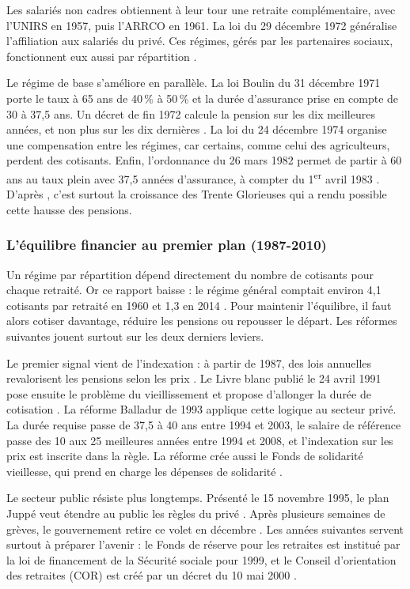 Les salariés non cadres obtiennent à leur tour une retraite complémentaire, avec l'UNIRS en 1957, puis l'ARRCO en 1961. La loi du 29 décembre 1972 généralise l'affiliation aux salariés du privé. Ces régimes, gérés par les partenaires sociaux, fonctionnent eux aussi par répartition \cite{valat2022}.

Le régime de base s'améliore en parallèle. La loi Boulin du 31 décembre 1971 porte le taux à 65 ans de 40\,\% à 50\,\% et la durée d'assurance prise en compte de 30 à 37,5 ans. Un décret de fin 1972 calcule la pension sur les dix meilleures années, et non plus sur les dix dernières \cite{cfdt}. La loi du 24 décembre 1974 organise une compensation entre les régimes, car certains, comme celui des agriculteurs, perdent des cotisants. Enfin, l'ordonnance du 26 mars 1982 permet de partir à 60 ans au taux plein avec 37,5 années d'assurance, à compter du 1\textsuperscript{er} avril 1983 \cite{fabas2023}. D'après \cite{valat2022}, c'est surtout la croissance des Trente Glorieuses qui a rendu possible cette hausse des pensions.

\subsubsection{L'équilibre financier au premier plan (1987-2010)}

Un régime par répartition dépend directement du nombre de cotisants pour chaque retraité. Or ce rapport baisse : le régime général comptait environ 4,1 cotisants par retraité en 1960 et 1,3 en 2014 \cite{cnav2015}. Pour maintenir l'équilibre, il faut alors cotiser davantage, réduire les pensions ou repousser le départ. Les réformes suivantes jouent surtout sur les deux derniers leviers.

Le premier signal vient de l'indexation : à partir de 1987, des lois annuelles revalorisent les pensions selon les prix \cite{cfdt}. Le Livre blanc publié le 24 avril 1991 pose ensuite le problème du vieillissement et propose d'allonger la durée de cotisation \cite{fabas2023}. La réforme Balladur de 1993 applique cette logique au secteur privé. La durée requise passe de 37,5 à 40 ans entre 1994 et 2003, le salaire de référence passe des 10 aux 25 meilleures années entre 1994 et 2008, et l'indexation sur les prix est inscrite dans la règle. La réforme crée aussi le Fonds de solidarité vieillesse, qui prend en charge les dépenses de solidarité \cite{cfdt}.

Le secteur public résiste plus longtemps. Présenté le 15 novembre 1995, le plan Juppé veut étendre au public les règles du privé \cite{fabas2023}. Après plusieurs semaines de grèves, le gouvernement retire ce volet en décembre \cite{universalis1995}. Les années suivantes servent surtout à préparer l'avenir : le Fonds de réserve pour les retraites est institué par la loi de financement de la Sécurité sociale pour 1999, et le Conseil d'orientation des retraites (COR) est créé par un décret du 10 mai 2000 \cite{fabas2023}.

